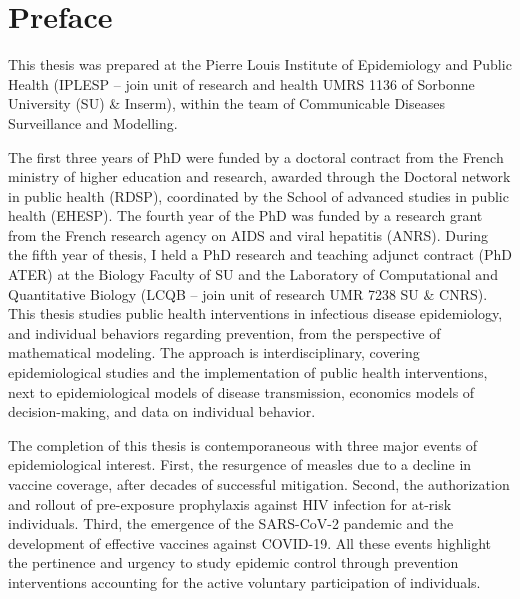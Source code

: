 \chapter*{Preface} 

This thesis was prepared at the Pierre Louis Institute of Epidemiology and Public Health (IPLESP -- join unit of research and health UMRS 1136 of Sorbonne University (SU) \& Inserm), within the team of Communicable Diseases Surveillance and Modelling.

The first three years of PhD were funded by a doctoral contract from the French ministry of higher education and research, awarded through the Doctoral network in public health (RDSP), coordinated by the School of advanced studies in public health (EHESP). The fourth year of the PhD was funded by a research grant from the French research agency on AIDS and viral hepatitis (ANRS). During the fifth year of thesis, I held a PhD research and teaching adjunct contract (PhD ATER) at the Biology Faculty of SU and the Laboratory of Computational and Quantitative Biology (LCQB -- join unit of research UMR 7238 SU \& CNRS).\\

This thesis studies public health interventions in infectious disease epidemiology, and individual behaviors regarding prevention, from the perspective of mathematical modeling. The approach is interdisciplinary, covering epidemiological studies and the implementation of public health interventions, next to epidemiological models of disease transmission, economics models of decision-making, and data on individual behavior.

The completion of this thesis is contemporaneous with three major events of epidemiological interest. First, the resurgence of measles due to a decline in vaccine coverage, after decades of successful mitigation. Second, the authorization and rollout of pre-exposure prophylaxis against HIV infection for at-risk individuals. Third, the emergence of the SARS-CoV-2 pandemic and the development of effective vaccines against COVID-19. All these events highlight the pertinence and urgency to study epidemic control through prevention interventions accounting for the active voluntary participation of individuals. 

